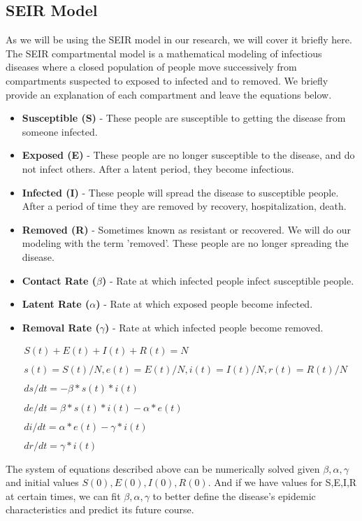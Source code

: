 \documentclass[12pt, a4, epsf] {article}
\theoremstyle{plain}
\theoremstyle{definition}
\begin{document}
\subsection{SEIR Model}
As we will be using the SEIR model in our research, we will cover it briefly here. The SEIR compartmental model is a mathematical modeling of infectious diseases where a closed population of people move successively from compartments suspected to exposed to infected and to removed. We briefly provide an explanation of each compartment and leave the equations below.
\begin{itemize}
	\item \textbf{Susceptible (S)} - These people are susceptible to getting the disease from someone infected.
	\item \textbf{Exposed (E)} - These people are no longer susceptible to the disease, and do not infect others. After a latent period, they become infectious.
	\item \textbf{Infected (I)} - These people will spread the disease to susceptible people. After a period of time they are removed by recovery, hospitalization, death.
	\item \textbf{Removed (R)} - Sometimes known as resistant or recovered. We will do our modeling with the term 'removed'. These people are no longer spreading the disease.
	\item \textbf{Contact Rate ($\beta$)} - Rate at which infected people infect susceptible people.
	\item \textbf{Latent Rate ($\alpha$)} - Rate at which exposed people become infected.
	\item \textbf{Removal Rate ($\gamma$)} - Rate at which infected people become removed.
\end{itemize}
\begin{align*}
&S(t) + E(t) + I(t) + R(t) = N \\\\
&s(t) = S(t)/N, e(t) = E(t)/N, i(t) = I(t)/N, r(t) = R(t)/N \\\\
&ds/dt = - \beta * s(t) * i(t) \\\\
&de/dt = \beta * s(t) * i(t) - \alpha * e(t) \\\\
&di/dt = \alpha * e(t) - \gamma * i(t) \\\\
&dr/dt = \gamma * i(t) \\\\
\end{align*}
The system of equations described above can be numerically solved given $\beta,\alpha,\gamma$ and initial values $S(0),E(0),I(0),R(0)$. And if we have values for S,E,I,R at certain times, we can fit $\beta,\alpha,\gamma$ to better define the disease's epidemic characteristics and predict its future course.
\end{document}
